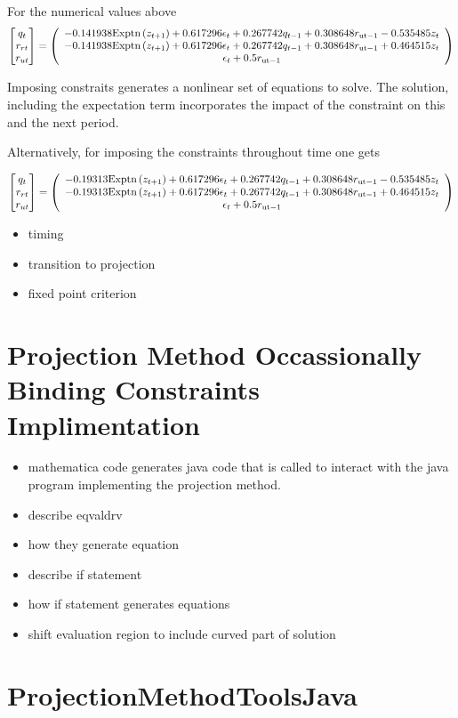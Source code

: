\documentclass[12pt]{article}
\begin{document}
For the numerical values above
\begin{gather*}
\begin{bmatrix} q_t\\r_{rt}\\r_{ut} \end{bmatrix}=    \left(
   \begin{array}{c}
    -0.141938 \text{Exptn}\left(z_{t+1}\right)+0.617296 \epsilon _t+0.267742
      q_{t-1}+0.308648 r_{\text{ut}-1}-0.535485 z_t \\
    -0.141938 \text{Exptn}\left(z_{t+1}\right)+0.617296 \epsilon _t+0.267742
      q_{t-1}+0.308648 r_{\text{ut}-1}+0.464515 z_t \\
    \epsilon _t+0.5 r_{\text{ut}-1}
   \end{array}
   \right)
\end{gather*}

Imposing constraits generates a nonlinear set of equations to solve.
The solution, including the expectation term incorporates the impact of the
constraint on this and the next period.

Alternatively, for imposing the constraints throughout time one gets

\begin{gather*}
\begin{bmatrix} q_t\\r_{rt}\\r_{ut} \end{bmatrix}=    \left(
   \begin{array}{c}
    -0.19313 \text{Exptn}\left(z_{t+1}\right)+0.617296 \epsilon _t+0.267742
      q_{t-1}+0.308648 r_{\text{ut}-1}-0.535485 z_t \\
    -0.19313 \text{Exptn}\left(z_{t+1}\right)+0.617296 \epsilon _t+0.267742
      q_{t-1}+0.308648 r_{\text{ut}-1}+0.464515 z_t \\
    \epsilon _t+0.5 r_{\text{ut}-1}
   \end{array}
   \right)
\end{gather*}
\begin{itemize}
\item timing
\item transition to projection
\item fixed point criterion
\end{itemize}
\section{Projection Method Occassionally Binding Constraints Implimentation}
\label{sec:proj-meth-occass}
\begin{itemize}
\item mathematica code generates java code that is called to interact with the java program implementing the projection method.
\item describe eqvaldrv
\item how they generate equation
\item describe if statement
\item how if statement generates equations
\item shift evaluation region to include curved part of solution
\end{itemize}


\appendix
\section{ProjectionMethodToolsJava}
\label{sec:proj}



\end{document}
